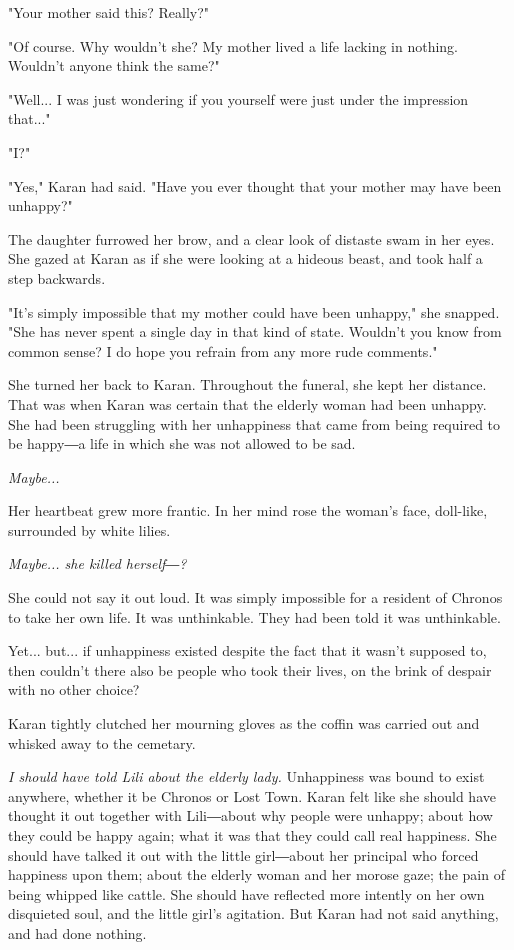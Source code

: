 "Your mother said this? Really?"

"Of course. Why wouldn't she? My mother lived a life lacking in nothing.
Wouldn't anyone think the same?"

"Well... I was just wondering if you yourself were just under the
impression that..."

"I?"

"Yes," Karan had said. "Have you ever thought that your mother may have
been unhappy?"

The daughter furrowed her brow, and a clear look of distaste swam in her
eyes. She gazed at Karan as if she were looking at a hideous beast, and
took half a step backwards.

"It's simply impossible that my mother could have been unhappy," she
snapped. "She has never spent a single day in that kind of state.
Wouldn't you know from common sense? I do hope you refrain from any more
rude comments."

She turned her back to Karan. Throughout the funeral, she kept her
distance. That was when Karan was certain that the elderly woman had
been unhappy. She had been struggling with her unhappiness that came
from being required to be happy―a life in which she was not allowed to
be sad.

\emph{Maybe...}

Her heartbeat grew more frantic. In her mind rose the woman's face,
doll-like, surrounded by white lilies.

\emph{Maybe... she killed herself―?}

She could not say it out loud. It was simply impossible for a resident
of Chronos to take her own life. It was unthinkable. They had been told
it was unthinkable.

Yet... but... if unhappiness existed despite the fact that it wasn't
supposed to, then couldn't there also be people who took their lives, on
the brink of despair with no other choice?

Karan tightly clutched her mourning gloves as the coffin was carried out
and whisked away to the cemetary.

\emph{I should have told Lili about the elderly lady.} Unhappiness was bound to
exist anywhere, whether it be Chronos or Lost Town. Karan felt like she
should have thought it out together with Lili―about why people were
unhappy; about how they could be happy again; what it was that they
could call real happiness. She should have talked it out with the little
girl―about her principal who forced happiness upon them; about the
elderly woman and her morose gaze; the pain of being whipped like
cattle. She should have reflected more intently on her own disquieted
soul, and the little girl's agitation. But Karan had not said anything,
and had done nothing.

